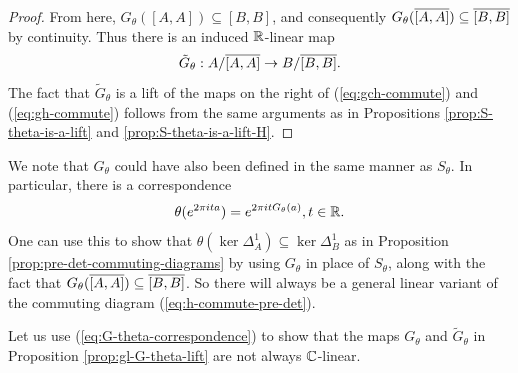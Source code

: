 \documentclass[12pt]{amsart}
\begin{document}
\begin{prop}
\begin{proof}
From here, $G_\theta([A,A]) \subseteq [B,B]$, and consequently $G_\theta(\overline{[A,A]}) \subseteq \overline{[B,B]}$ by continuity.
Thus there is an induced $\mathbb{R}$-linear map
\begin{equation}
\tilde{G}_\theta: A/\overline{[A,A]} \to B/\overline{[B,B]}. 
\end{equation}
The fact that $\tilde{G}_\theta$ is a lift of the maps on the right of (\ref{eq:gch-commute}) and (\ref{eq:gh-commute}) follows from the same arguments as in Propositions \ref{prop:S-theta-is-a-lift} and \ref{prop:S-theta-is-a-lift-H}.
\end{proof}
\end{prop}

\begin{remark}
We note that $G_\theta$ could have also been defined in the same manner as $S_\theta$. In particular, there is a correspondence
\begin{equation}\label{eq:G-theta-correspondence}
\theta(e^{2\pi i t a}) = e^{2\pi i t G_\theta(a)}, t \in \mathbb{R}.
\end{equation}
One can use this to show that $\theta(\ker \Delta_A^1) \subseteq \ker \Delta_B^1$ as in Proposition \ref{prop:pre-det-commuting-diagrams} by using $G_\theta$ in place of $S_\theta$, along with the fact that $G_\theta(\overline{[A,A]}) \subseteq \overline{[B,B]}$. So there will always be a general linear variant of the commuting diagram (\ref{eq:h-commute-pre-det}). 
\end{remark}

Let us use (\ref{eq:G-theta-correspondence}) to show that the maps $G_\theta$ and $\tilde{G}_\theta$ in Proposition \ref{prop:gl-G-theta-lift} are not always $\mathbb{C}$-linear.
\end{document}
